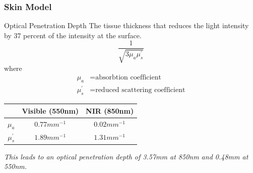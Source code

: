 \documentclass{beamer}
\begin{document}
\begin{frame}
\frametitle{Skin Model}
\begin{block}{Optical Penetration Depth}
The tissue thickness that reduces the light intensity by 37 percent of the intensity at the surface.
\begin{equation}
\frac{1}{\sqrt{3\mu_a\mu^\prime_s}}
\end{equation}
where
\begin{equation}
\begin{split}
\mu_a &= \text{absorbtion coefficient} \\
\mu^\prime_s &= \text{reduced scattering coefficient}
\end{split}
\end{equation}
\begin{center}
\begin{tabular}{c|cc}
& Visible (550nm) & NIR (850nm) \\
\hline
$\mu_a$ & $0.77mm^{-1}$ & $0.02mm^{-1}$ \\
$\mu^\prime_s$ & $1.89mm^{-1}$ & $1.31mm^{-1}$
\end{tabular}
\end{center}
\emph{This leads to an optical penetration depth of 3.57mm at 850nm and 0.48mm at 550nm.}
\end{block}
\end{frame}
\end{document}
